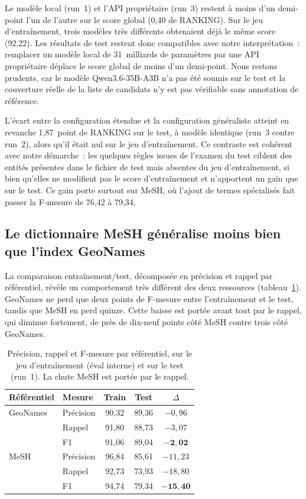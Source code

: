 \documentclass[10pt,twoside]{article}
\begin{document}
Le modèle local (run~1) et l'API propriétaire (run~3) restent à moins d'un demi-point l'un de
l'autre sur le score global (0,40 de RANKING). Sur le jeu d'entraînement, trois modèles très différents obtenaient déjà le même score (92,22). Les
résultats de test restent donc compatibles avec notre interprétation~: remplacer un modèle local de
31~milliards de paramètres par une API propriétaire déplace le score global de moins d'un
demi-point. Nous restons prudents, car le modèle Qwen3.6-35B-A3B n'a pas été soumis sur le test et
la couverture réelle de la liste de candidats n'y est pas vérifiable sans annotation de référence.

L'écart entre la configuration étendue et la configuration généraliste atteint en revanche
1,87~point de RANKING sur le test, à modèle identique (run~3 contre run~2), alors qu'il était nul
sur le jeu d'entraînement. Ce contraste est cohérent avec notre démarche~: les quelques règles issues de l'examen du
test ciblent des entités présentes dans le fichier de test mais absentes du jeu d'entraînement, si bien
qu'elles ne modifient pas le score d'entraînement et n'apportent un gain que sur le test. Ce gain porte
surtout sur MeSH, où l'ajout de termes spécialisés fait passer la F-mesure de 76,42 à 79,34.

\subsection{Le dictionnaire MeSH généralise moins bien que l'index GeoNames}
La comparaison entraînement/test, décomposée en précision et rappel par référentiel, révèle un
comportement très différent des deux ressources (tableau~\ref{tab:traintest}). GeoNames ne perd
que deux points de F-mesure entre l'entraînement et le test, tandis que MeSH en perd quinze. Cette baisse
est portée avant tout par le rappel, qui diminue fortement, de près de dix-neuf points côté MeSH
contre trois côté GeoNames.

\begin{table}[!h]
\centering
\small
\setlength{\tabcolsep}{5pt}
\begin{tabular}{llccc}
\toprule
Référentiel & Mesure & Train & Test & $\Delta$ \\
\midrule
GeoNames & Précision & 90,32 & 89,36 & $-0{,}96$ \\
         & Rappel & 91,80 & 88,73 & $-3{,}07$ \\
         & F1 & 91,06 & 89,04 & $\mathbf{-2{,}02}$ \\
\midrule
MeSH & Précision & 96,84 & 85,61 & $-11{,}23$ \\
     & Rappel & 92,73 & 73,93 & $-18{,}80$ \\
     & F1 & 94,74 & 79,34 & $\mathbf{-15{,}40}$ \\
\bottomrule
\end{tabular}
\caption{Précision, rappel et F-mesure par référentiel, sur le jeu d'entraînement (éval interne) et sur le test
(run~1). La chute MeSH est portée par le rappel.}
\label{tab:traintest}
\end{table}
\end{document}
